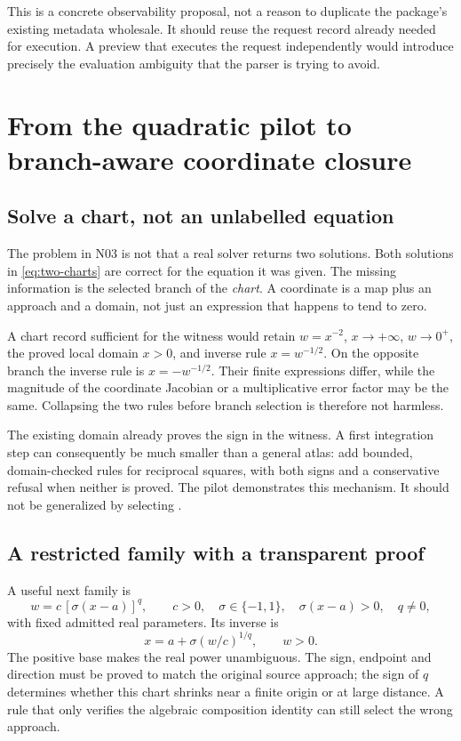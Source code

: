 \documentclass[11pt,a4paper]{article}
\newcommand{\code}[1]{\texttt{\detokenize{#1}}}
\begin{document}
This is a concrete observability proposal, not a reason to duplicate the package's existing metadata wholesale. It should reuse the request record already needed for execution. A preview that executes the request independently would introduce precisely the evaluation ambiguity that the parser is trying to avoid.

\section{From the quadratic pilot to branch-aware coordinate closure}
\label{sec:charts}
\subsection{Solve a chart, not an unlabelled equation}
The problem in N03 is not that a real solver returns two solutions. Both solutions in \eqref{eq:two-charts} are correct for the equation it was given. The missing information is the selected branch of the \emph{chart}. A coordinate is a map plus an approach and a domain, not just an expression that happens to tend to zero.

A chart record sufficient for the witness would retain $w=x^{-2}$, $x\to+\infty$, $w\to0^+$, the proved local domain $x>0$, and inverse rule $x=w^{-1/2}$. On the opposite branch the inverse rule is $x=-w^{-1/2}$. Their finite expressions differ, while the magnitude of the coordinate Jacobian or a multiplicative error factor may be the same. Collapsing the two rules before branch selection is therefore not harmless.

The existing domain already proves the sign in the witness. A first integration step can consequently be much smaller than a general atlas: add bounded, domain-checked rules for reciprocal squares, with both signs and a conservative refusal when neither is proved. The pilot demonstrates this mechanism. It should not be generalized by selecting \code{First[Solve[...]]}.

\subsection{A restricted family with a transparent proof}
A useful next family is
\begin{equation}
 w=c\,[\sigma(x-a)]^q,\qquad
 c>0,\quad \sigma\in\{-1,1\},\quad \sigma(x-a)>0,
 \quad q\ne0,
 \label{eq:signed-monomial-chart}
\end{equation}
with fixed admitted real parameters. Its inverse is
\begin{equation}
 x=a+\sigma(w/c)^{1/q},\qquad w>0.
 \label{eq:signed-monomial-inverse}
\end{equation}
The positive base makes the real power unambiguous. The sign, endpoint and direction must be proved to match the original source approach; the sign of $q$ determines whether this chart shrinks near a finite origin or at large distance. A rule that only verifies the algebraic composition identity can still select the wrong approach.
\end{document}
